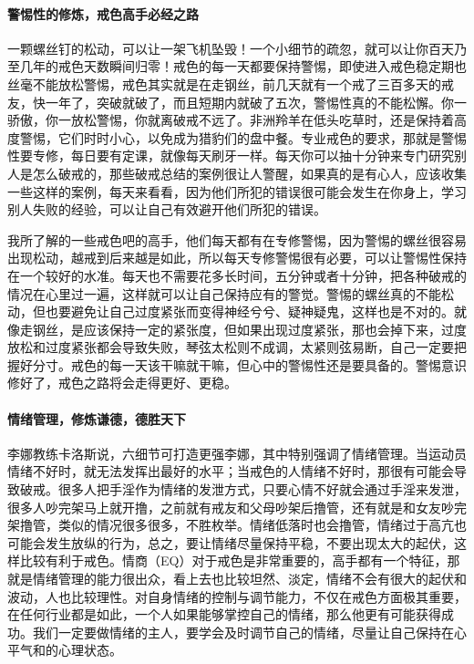\paragraph{警惕性的修炼，戒色高手必经之路}

一颗螺丝钉的松动，可以让一架飞机坠毁！一个小细节的疏忽，就可以让你百天乃至几年的戒色天数瞬间归零！戒色的每一天都要保持警惕，即使进入戒色稳定期也丝毫不能放松警惕，戒色其实就是在走钢丝，前几天就有一个戒了三百多天的戒友，快一年了，突破就破了，而且短期内就破了五次，警惕性真的不能松懈。你一骄傲，你一放松警惕，你就离破戒不远了。非洲羚羊在低头吃草时，还是保持着高度警惕，它们时时小心，以免成为猎豹们的盘中餐。专业戒色的要求，那就是警惕性要专修，每日要有定课，就像每天刷牙一样。每天你可以抽十分钟来专门研究别人是怎么破戒的，那些破戒总结的案例很让人警醒，如果真的是有心人，应该收集一些这样的案例，每天来看看，因为他们所犯的错误很可能会发生在你身上，学习别人失败的经验，可以让自己有效避开他们所犯的错误。

我所了解的一些戒色吧的高手，他们每天都有在专修警惕，因为警惕的螺丝很容易出现松动，越戒到后来越是如此，所以每天专修警惕很有必要，可以让警惕性保持在一个较好的水准。每天也不需要花多长时间，五分钟或者十分钟，把各种破戒的情况在心里过一遍，这样就可以让自己保持应有的警觉。警惕的螺丝真的不能松动，但也要避免让自己过度紧张而变得神经兮兮、疑神疑鬼，这样也是不对的。就像走钢丝，是应该保持一定的紧张度，但如果出现过度紧张，那也会掉下来，过度放松和过度紧张都会导致失败，琴弦太松则不成调，太紧则弦易断，自己一定要把握好分寸。戒色的每一天该干嘛就干嘛，但心中的警惕性还是要具备的。警惕意识修好了，戒色之路将会走得更好、更稳。

\paragraph{情绪管理，修炼谦德，德胜天下}

李娜教练卡洛斯说，六细节可打造更强李娜，其中特别强调了情绪管理。当运动员情绪不好时，就无法发挥出最好的水平；当戒色的人情绪不好时，那很有可能会导致破戒。很多人把手淫作为情绪的发泄方式，只要心情不好就会通过手淫来发泄，很多人吵完架马上就开撸，之前就有戒友和父母吵架后撸管，还有就是和女友吵完架撸管，类似的情况很多很多，不胜枚举。情绪低落时也会撸管，情绪过于高亢也可能会发生放纵的行为，总之，要让情绪尽量保持平稳，不要出现太大的起伏，这样比较有利于戒色。情商（EQ）对于戒色是非常重要的，高手都有一个特征，那就是情绪管理的能力很出众，看上去也比较坦然、淡定，情绪不会有很大的起伏和波动，人也比较理性。对自身情绪的控制与调节能力，不仅在戒色方面极其重要，在任何行业都是如此，一个人如果能够掌控自己的情绪，那么他更有可能获得成功。我们一定要做情绪的主人，要学会及时调节自己的情绪，尽量让自己保持在心平气和的心理状态。

